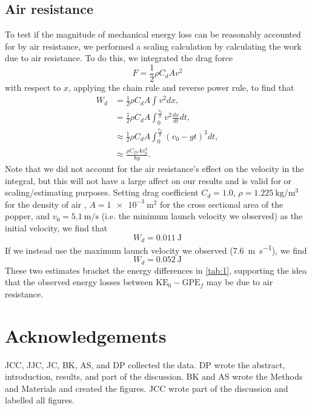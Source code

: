 \documentclass[reprint,amsmath,amssymb,aps,twoside]{revtex4-2} %
\begin{document}
\subsection{Air resistance}
To test if the magnitude of mechanical energy loss can be reasonably accounted for by air resistance, we performed a scaling calculation by calculating the work due to air resistance. To do this, we integrated the drag force
\begin{equation}
F = \frac{1}{2}\rho C_d Av^2
\end{equation}
with respect to $x$, applying the chain rule and reverse power rule, to find that 
\begin{align}
W_d 
&= \frac{1}{2}\rho C_d A\int v^2 dx, \\
&= \frac{1}{2}\rho C_d A\int_0^{\frac{v_0}{g}} v^2 \frac{dx}{dt} dt, \\
&\approx \frac{1}{2}\rho C_d A\int_0^{\frac{v_0}{g}} (v_0-gt)^3 dt, \\
&\approx \frac{\rho C_DAv_0^4}{8g}.
\end{align}
Note that we did not account for the air resistance's effect on the velocity in the integral, but this will not have a large affect on our results and is valid for or scaling/estimating purposes. Setting drag coefficient $C_d=1.0$, $\rho=\qty{1.225}{\kilo\gram\per\meter\cubed}$ for the density of air \cite{tipler}, $A=\qty{1e-3}{\meter\squared}$ for the cross sectional area of the popper, and $v_0=\qty{5.1}{\meter\per\second}$ (i.e. the minimum launch velocity we observed) as the initial velocity, we find that
\begin{equation}
W_d = \qty{0.011}{\joule}
\end{equation}
If we instead use the maximum launch velocity we observed (\qty{7.6}{\meter\per\second}), we find
\begin{equation}
W_d = \qty{0.052}{\joule}
\end{equation}
These two estimates bracket the energy differences in \cref{tab:1}, supporting the idea that the observed energy losses between $\text{KE}_0-\text{GPE}_f$ may be due to air resistance. 







    
    
\section{Acknowledgements}
JCC, JJC, JC, BK, AS, and DP collected the data. DP wrote the abstract, introduction, results, and part of the discussion. BK and AS wrote the Methods and Materials and created the figures. JCC wrote part of the discussion and labelled all figures. 








\end{document}
